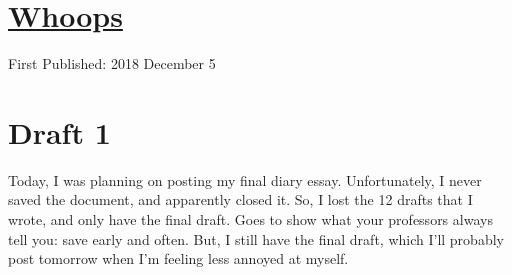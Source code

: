 \documentclass[12pt]{article}[titlepage]
\newcommand{\1}{\={a}}
\newcommand{\2}{\={e}}
\newcommand{\3}{\={\i}}
\newcommand{\4}{\=o}
\newcommand{\5}{\=u}
\newcommand{\6}{\={A}}
\renewcommand{\,}{\textsuperscript{,}}
\begin{document}
\doublespacing
\section{\href{whoops.html}{Whoops}}
First Published: 2018 December 5
\section{Draft 1}
Today, I was planning on posting my final diary essay.
Unfortunately, I never saved the document, and apparently closed it.
So, I lost the 12 drafts that I wrote, and only have the final draft.
Goes to show what your professors always tell you: save early and often.
But, I still have the final draft, which I'll probably post tomorrow when I'm feeling less annoyed at myself.
\end{document}
